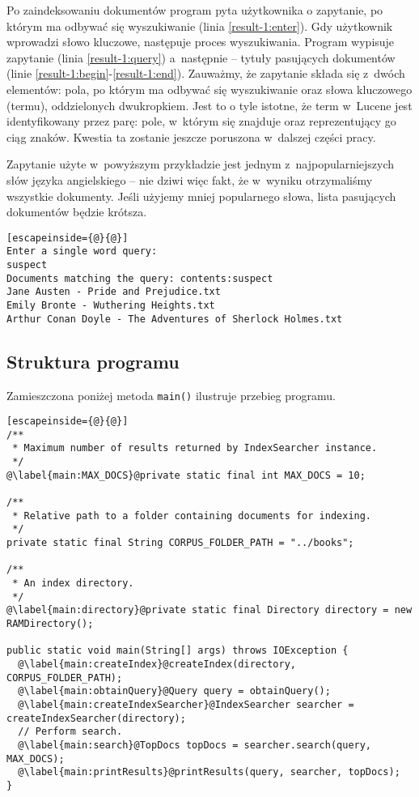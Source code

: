 Po zaindeksowaniu dokumentów program pyta użytkownika o zapytanie, po którym ma odbywać się wyszukiwanie (linia \ref{result-1:enter}). Gdy użytkownik wprowadzi słowo kluczowe, następuje proces wyszukiwania. Program wypisuje zapytanie (linia \ref{result-1:query}) a~następnie -- tytuły pasujących dokumentów (linie \ref{result-1:begin}-\ref{result-1:end}). Zauważmy, że zapytanie składa się z~dwóch elementów: pola, po którym ma odbywać się wyszukiwanie oraz słowa kluczowego (termu), oddzielonych dwukropkiem. Jest to o tyle istotne, że term w~Lucene jest identyfikowany przez parę: pole, w~którym się znajduje oraz reprezentujący go ciąg znaków. Kwestia ta zostanie jeszcze poruszona w~dalszej części pracy.

Zapytanie użyte w~powyższym przykładzie jest jednym z~najpopularniejszych słów języka angielskiego -- nie dziwi więc fakt, że w~wyniku otrzymaliśmy wszystkie dokumenty. Jeśli użyjemy mniej popularnego słowa, lista pasujących dokumentów będzie krótsza.

\begin{lstlisting}[escapeinside={@}{@}]
Enter a single word query:
suspect
Documents matching the query: contents:suspect
Jane Austen - Pride and Prejudice.txt
Emily Bronte - Wuthering Heights.txt
Arthur Conan Doyle - The Adventures of Sherlock Holmes.txt
\end{lstlisting}

\subsection{Struktura programu}

Zamieszczona poniżej metoda \texttt{main()} ilustruje przebieg programu.

\begin{lstlisting}[escapeinside={@}{@}]
/**
 * Maximum number of results returned by IndexSearcher instance.
 */
@\label{main:MAX_DOCS}@private static final int MAX_DOCS = 10;

/**
 * Relative path to a folder containing documents for indexing.
 */
private static final String CORPUS_FOLDER_PATH = "../books";

/**
 * An index directory.
 */
@\label{main:directory}@private static final Directory directory = new RAMDirectory();

public static void main(String[] args) throws IOException {
  @\label{main:createIndex}@createIndex(directory, CORPUS_FOLDER_PATH);
  @\label{main:obtainQuery}@Query query = obtainQuery();
  @\label{main:createIndexSearcher}@IndexSearcher searcher = createIndexSearcher(directory);
  // Perform search.
  @\label{main:search}@TopDocs topDocs = searcher.search(query, MAX_DOCS);
  @\label{main:printResults}@printResults(query, searcher, topDocs);
}
\end{lstlisting}

